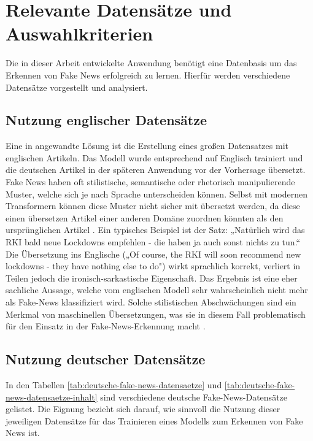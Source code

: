 \chapter{Relevante Datensätze und Auswahlkriterien}
\label{chap:relevante_datensaetze_und_auswahlkriterien}

Die in dieser Arbeit entwickelte Anwendung benötigt eine Datenbasis um das Erkennen von Fake News erfolgreich zu lernen.
Hierfür werden verschiedene Datensätze vorgestellt und analysiert.

\section{Nutzung englischer Datensätze} \label{sec:english_datasets}

Eine in \cite{Simone2022} angewandte Lösung ist die Erstellung eines großen Datensatzes mit englischen Artikeln. Das Modell wurde entsprechend auf Englisch 
trainiert und die deutschen Artikel in der späteren Anwendung vor der Vorhersage übersetzt.
Fake News haben oft stilistische, semantische oder rhetorisch manipulierende Muster, welche sich je nach Sprache unterscheiden können.
Selbst mit modernen Transformern können diese Muster nicht sicher mit übersetzt werden, da diese einen übersetzen Artikel einer anderen Domäne zuordnen könnten
als den ursprünglichen Artikel \cite{hong2023disentanglingstructurestylepolitical}. 
Ein typisches Beispiel ist der Satz: „Natürlich wird das RKI bald neue Lockdowns empfehlen - die haben ja auch sonst nichts zu tun.“ 
Die Übersetzung ins Englische („Of course, the RKI will soon recommend new lockdowns - they have nothing else to do") wirkt sprachlich korrekt, 
verliert in Teilen jedoch die ironisch-sarkastische Eigenschaft.
Das Ergebnis ist eine eher sachliche Aussage, welche vom englischen Modell sehr wahrscheinlich nicht mehr als Fake-News klassifiziert wird.
Solche stilistischen Abschwächungen sind ein Merkmal von maschinellen Übersetzungen, was sie in diesem Fall problematisch
für den Einsatz in der Fake-News-Erkennung macht \cite{kuehn2024enhancingrhetoricalfigureannotation}.

\section{Nutzung deutscher Datensätze}
\label{sec:auswahl_und_begruendung_finaler_datensatz}

In den Tabellen \ref{tab:deutsche-fake-news-datensaetze} und \ref{tab:deutsche-fake-news-datensaetze-inhalt} sind verschiedene deutsche Fake-News-Datensätze gelistet.
Die Eignung bezieht sich darauf, wie sinnvoll die Nutzung dieser jeweiligen Datensätze für das Trainieren eines Modells zum Erkennen von Fake News ist.

